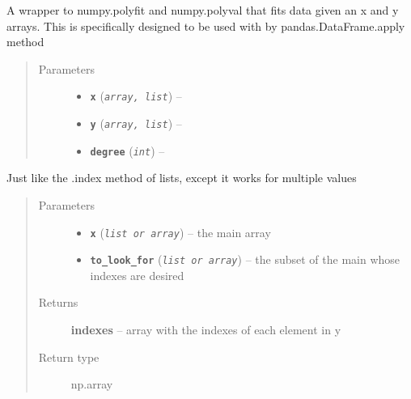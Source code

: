 \documentclass[a4paper,10pt,oneside]{sphinxmanual}
\begin{document}

\begin{fulllineitems}
\label{pymicra.algs:pymicra.algs.general.fitWrap}
A wrapper to numpy.polyfit and numpy.polyval that fits data given an x and y arrays.
This is specifically designed to be used with by pandas.DataFrame.apply method
\begin{quote}\begin{description}
\item[{Parameters}] \leavevmode\begin{itemize}
\item {} 
\textbf{\texttt{x}} (\emph{\texttt{array, list}}) -- 

\item {} 
\textbf{\texttt{y}} (\emph{\texttt{array, list}}) -- 

\item {} 
\textbf{\texttt{degree}} (\emph{\texttt{int}}) -- 

\end{itemize}

\end{description}\end{quote}

\end{fulllineitems}


\begin{fulllineitems}
\label{pymicra.algs:pymicra.algs.general.get_index}
Just like the .index method of lists, except it works for multiple values
\begin{quote}\begin{description}
\item[{Parameters}] \leavevmode\begin{itemize}
\item {} 
\textbf{\texttt{x}} (\emph{\texttt{list or array}}) -- the main array

\item {} 
\textbf{\texttt{to\_look\_for}} (\emph{\texttt{list or array}}) -- the subset of the main whose indexes are desired

\end{itemize}

\item[{Returns}] \leavevmode
\textbf{indexes} -- array with the indexes of each element in y

\item[{Return type}] \leavevmode
np.array

\end{description}\end{quote}

\end{fulllineitems}
\end{document}

